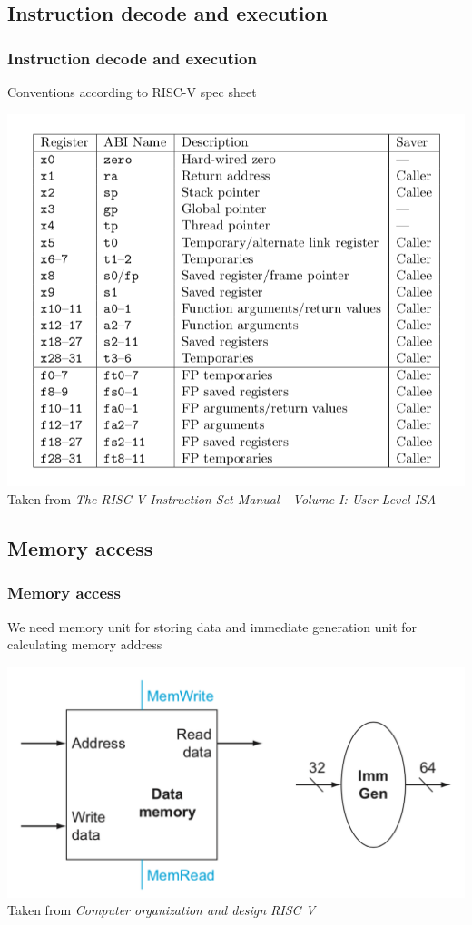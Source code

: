 \documentclass{beamer}
\begin{document}
    \begin{frame}
        \subsection{Instruction decode and execution}
        \frametitle{Instruction decode and execution}
        \centering
        \vspace{-0.5cm}
        Conventions according to RISC-V spec sheet
        
        \includegraphics[scale=0.5]{"Pictures and plots/registercon"} \\
        \scriptsize{Taken from \textit{The RISC-V Instruction Set Manual - Volume I: User-Level ISA}}
        
    \end{frame}

    \begin{frame}
        \subsection{Memory access}
        \frametitle{Memory access}
        \centering
        \vspace{-0.5cm}
        We need memory unit for storing data and immediate generation unit for calculating memory address
        
        \includegraphics[scale=0.4]{"Pictures and plots/MEMACC"} \\
        \scriptsize{Taken from \textit{Computer organization and design RISC V}}
        
    \end{frame}
\end{document}
